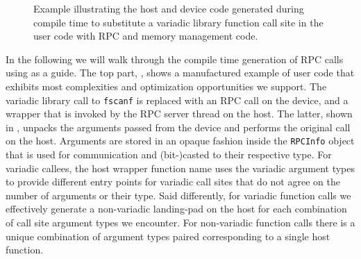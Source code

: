 \begin{figure}[p]
\caption{
Example illustrating the host and device code generated during compile time to substitute a variadic library function call site in the user code with RPC and memory management code.
}
\label{fig:rpc_gen}
\end{figure}

In the following we will walk through the compile time generation of RPC calls using  as a guide.
The top part, , shows a manufactured example of user code that exhibits most complexities and optimization opportunities we support.
The variadic library call to \lstinline{fscanf} is replaced with an RPC call on the device, and a wrapper that is invoked by the RPC server thread on the host.
The latter, shown in , unpacks the arguments passed from the device and performs the original call on the host.
Arguments are stored in an opaque fashion inside the \lstinline{RPCInfo} object that is used for communication and (bit-)casted to their respective type.
For variadic callees, the host wrapper function name uses the variadic argument types to provide different entry points for variadic call sites that do not agree on the number of arguments or their type.
Said differently, for variadic function calls we effectively generate a non-variadic landing-pad on the host for each combination of call site argument types we encounter.
For non-variadic function calls there is a unique combination of argument types paired corresponding to a single host function.

